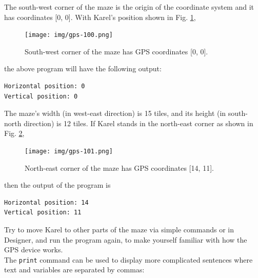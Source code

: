 \noindent
The south-west corner of the maze is the origin of the coordinate system and it has 
coordinates [0, 0]. With Karel's position shown in Fig. \ref{fig:gps-100},
\newpage
\begin{figure}[!ht]
\begin{center}
\texttt{[image: img/gps-100.png]}
\vspace{-0mm}
\caption{South-west corner of the maze has GPS coordinates [0, 0].}
\vspace{-6mm}
\label{fig:gps-100}
\end{center}
\end{figure}
\noindent
the above program will have the following output:\\

\begin{ybox}
\begin{verbatim}
Horizontal position: 0
Vertical position: 0
\end{verbatim}
\end{ybox}
\vspace{6mm}

\noindent
The maze's width (in west-east direction) is 15 tiles, and its height (in south-north direction) 
is 12 tiles. If Karel stands in the north-east corner as shown in Fig. \ref{fig:gps-101},
\newpage
\begin{figure}[!ht]
\begin{center}
\texttt{[image: img/gps-101.png]}
\vspace{-0mm}
\caption{North-east corner of the maze has GPS coordinates [14, 11].}
\label{fig:gps-101}
\end{center}
\end{figure}

\noindent
then the output of the program is\\

\begin{ybox}
\begin{verbatim}
Horizontal position: 14
Vertical position: 11
\end{verbatim}
\end{ybox}
\vspace{6mm}

\noindent
Try to move Karel to other parts of the maze via simple commands or in Designer, 
and run the program again, to make yourself familiar with how the GPS device works.\\

\noindent
The {\tt print} command can be used to display more complicated sentences where text
and variables are separated by commas:\\

